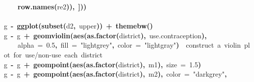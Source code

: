 \documentclass{article}
\makeatletter
\newcommand{\hlnumber}[1]{\textcolor[rgb]{0,0,0}{#1}}%
\newcommand{\hlfunctioncall}[1]{\textcolor[rgb]{.5,0,.33}{\textbf{#1}}}%
\newcommand{\hlstring}[1]{\textcolor[rgb]{.6,.6,1}{#1}}%
\newcommand{\hlkeyword}[1]{\textbf{#1}}%
\newcommand{\hlargument}[1]{\textcolor[rgb]{.69,.25,.02}{#1}}%
\newcommand{\hlcomment}[1]{\textcolor[rgb]{.18,.6,.34}{#1}}%
\newcommand{\hlassignement}[1]{\textbf{#1}}%
\newcommand{\hlsymbol}[1]{#1}%
\newcommand{\hlstd}[1]{\textcolor[rgb]{0,0,0}{#1}}%
\newenvironment{kframe}{%
 \def\FrameCommand##1{\hskip\@totalleftmargin \hskip-\fboxsep
 \colorbox{shadecolor}{##1}\hskip-\fboxsep
     \hskip-\linewidth \hskip-\@totalleftmargin \hskip\columnwidth}%
 \MakeFramed {\advance\hsize-\width
   \@totalleftmargin\z@ \linewidth\hsize
   \@setminipage}}%
 {\par\unskip\endMakeFramed}
\newenvironment{knitrout}{}{} %
\makeatother
\begin{document}
\begin{knitrout}
{\begin{kframe}
\begin{flushleft}
\hlstd{}{\ }{\ }{\ }{\ }\hlfunctioncall{row.names}\hlkeyword{(}\hlsymbol{re2}\hlkeyword{)}\hlkeyword{)}\hlkeyword{,}{\ }\hlkeyword{]}\hlkeyword{)}\hlkeyword{)}\hspace*{\fill}\\
\hlstd{}\hspace*{\fill}\\
\hlstd{}\hlsymbol{g}{\ }\hlassignement{\usebox{\hlnormalsizeboxlessthan}-}{\ }\hlfunctioncall{ggplot}\hlkeyword{(}\hlfunctioncall{subset}\hlkeyword{(}\hlsymbol{d2}\hlkeyword{,}{\ }\hlsymbol{upper}\hlkeyword{)}\hlkeyword{)}{\ }\hlkeyword{+}{\ }\hlfunctioncall{theme\usebox{\hlnormalsizeboxunderscore}bw}\hlkeyword{(}\hlkeyword{)}\hspace*{\fill}\\
\hlstd{}\hlsymbol{g}{\ }\hlassignement{\usebox{\hlnormalsizeboxlessthan}-}{\ }\hlsymbol{g}{\ }\hlkeyword{+}{\ }\hlfunctioncall{geom\usebox{\hlnormalsizeboxunderscore}violin}\hlkeyword{(}\hlfunctioncall{aes}\hlkeyword{(}\hlfunctioncall{as.factor}\hlkeyword{(}\hlsymbol{district}\hlkeyword{)}\hlkeyword{,}{\ }\hlsymbol{use.contraception}\hlkeyword{)}\hlkeyword{,}\hspace*{\fill}\\
\hlstd{}{\ }{\ }{\ }{\ }\hlargument{alpha}{\ }\hlargument{=}{\ }\hlnumber{0.5}\hlkeyword{,}{\ }\hlargument{fill}{\ }\hlargument{=}{\ }\hlstring{"{}lightgrey"{}}\hlkeyword{,}{\ }\hlargument{color}{\ }\hlargument{=}{\ }\hlstring{"{}lightgray"{}}\hlkeyword{)}{\ }{\ }\hlcomment{\usebox{\hlnormalsizeboxhash}\usebox{\hlnormalsizeboxhash}{\ }construct{\ }a{\ }violin{\ }plot{\ }for{\ }use/non-use{\ }each{\ }district}\hspace*{\fill}\\
\hlstd{}\hlsymbol{g}{\ }\hlassignement{\usebox{\hlnormalsizeboxlessthan}-}{\ }\hlsymbol{g}{\ }\hlkeyword{+}{\ }\hlfunctioncall{geom\usebox{\hlnormalsizeboxunderscore}point}\hlkeyword{(}\hlfunctioncall{aes}\hlkeyword{(}\hlfunctioncall{as.factor}\hlkeyword{(}\hlsymbol{district}\hlkeyword{)}\hlkeyword{,}{\ }\hlsymbol{m1}\hlkeyword{)}\hlkeyword{,}{\ }\hlargument{size}{\ }\hlargument{=}{\ }\hlnumber{1.5}\hlkeyword{)}\hspace*{\fill}\\
\hlstd{}\hlsymbol{g}{\ }\hlassignement{\usebox{\hlnormalsizeboxlessthan}-}{\ }\hlsymbol{g}{\ }\hlkeyword{+}{\ }\hlfunctioncall{geom\usebox{\hlnormalsizeboxunderscore}point}\hlkeyword{(}\hlfunctioncall{aes}\hlkeyword{(}\hlfunctioncall{as.factor}\hlkeyword{(}\hlsymbol{district}\hlkeyword{)}\hlkeyword{,}{\ }\hlsymbol{m2}\hlkeyword{)}\hlkeyword{,}{\ }\hlargument{color}{\ }\hlargument{=}{\ }\hlstring{"{}darkgrey"{}}\hlkeyword{,}\hspace*{\fill}\\

\end{flushleft}
\end{kframe}}
\end{knitrout}
\end{document}
